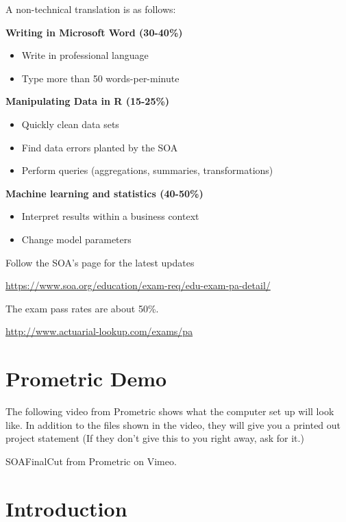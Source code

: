 \documentclass[openany]{book}
\providecommand{\tightlist}{%
  \setlength{\itemsep}{0pt}\setlength{\parskip}{0pt}}
\begin{document}
A non-technical translation is as follows:

\textbf{Writing in Microsoft Word (30-40\%)}

\begin{itemize}
\tightlist
\item
  Write in professional language
\item
  Type more than 50 words-per-minute
\end{itemize}

\textbf{Manipulating Data in R (15-25\%)}

\begin{itemize}
\tightlist
\item
  Quickly clean data sets
\item
  Find data errors planted by the SOA
\item
  Perform queries (aggregations, summaries, transformations)
\end{itemize}

\textbf{Machine learning and statistics (40-50\%)}

\begin{itemize}
\tightlist
\item
  Interpret results within a business context
\item
  Change model parameters
\end{itemize}

Follow the SOA's page for the latest updates

\url{https://www.soa.org/education/exam-req/edu-exam-pa-detail/}

The exam pass rates are about 50\%.

\url{http://www.actuarial-lookup.com/exams/pa}

\hypertarget{prometric-demo}{%
\chapter{Prometric Demo}\label{prometric-demo}}

The following video from Prometric shows what the computer set up will look like. In addition to the files shown in the video, they will give you a printed out project statement (If they don't give this to you right away, ask for it.)

SOAFinalCut from Prometric on Vimeo.

\hypertarget{introduction}{%
\chapter{Introduction}\label{introduction}}
\end{document}
